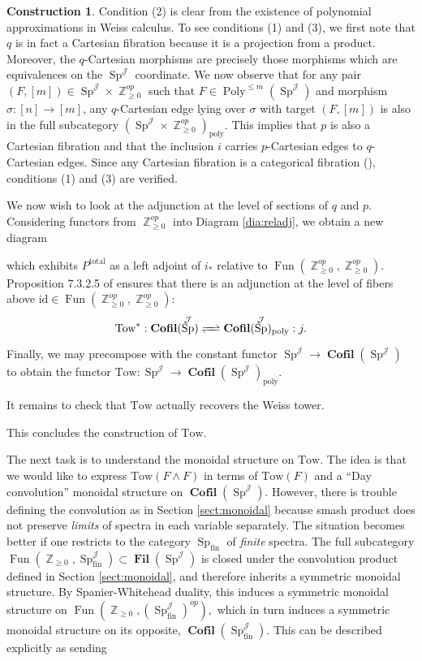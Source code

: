 \documentclass[reqno, oneside]{amsart}
\theoremstyle{definition}
\newtheorem{cnstr}[nul]{Construction}
\theoremstyle{plain}
\DeclareMathOperator{\Z}{\mathbb{Z}}
\DeclareMathOperator{\Poly}{\text{Poly}}
\DeclareMathOperator{\fin}{\text{fin}}
\DeclareMathOperator{\Fil}{\textbf{Fil}}
\DeclareMathOperator{\Fun}{\text{Fun}}
\DeclareMathOperator{\Sp}{\text{Sp}}
\DeclareMathOperator{\J}{\mathcal{J}}
\DeclareMathOperator{\Cofil}{\textbf{Cofil}}
\begin{document}
\begin{cnstr}
Condition (2) is clear from the existence of polynomial approximations in Weiss calculus.  To see conditions (1) and (3), we first note that $q$ is in fact a Cartesian fibration because it is a projection from a product.  Moreover, the $q$-Cartesian morphisms are precisely those morphisms which are equivalences on the $\Sp^{\J}$ coordinate.  We now observe that for any pair $(F, [m]) \in \Sp^{\J}\times \Z^{op}_{\geq 0}$ such that $F\in \Poly^{\leq m}(\Sp^{\J})$ and morphism $\sigma :[n]\to [m]$, any $q$-Cartesian edge lying over $\sigma$ with target $(F, [m])$ is also in the full subcategory $(\Sp^{\J}\times \Z^{op}_{\geq 0})_{\text{poly}}.$  This implies that $p$ is also a Cartesian fibration and that the inclusion $i$ carries $p$-Cartesian edges to $q$-Cartesian edges.  Since any Cartesian fibration is a categorical fibration (\cite[Proposition 3.3.1.7]{HTT}), conditions (1) and (3) are verified.  

We now wish to look at the adjunction at the level of sections of $q$ and $p$.  Considering functors from $\Z_{\geq 0}^{op}$ into Diagram \ref{dia:reladj}, we obtain a new diagram %

which exhibits $P^{\text{total}}$ as a left adjoint of $i_*$ relative to $\Fun(\Z_{\geq 0}^{op},\Z_{\geq 0}^{op}).$  Proposition 7.3.2.5 of \cite{HA} ensures that there is an adjunction at the level of fibers above $\text{id}\in \Fun(\Z_{\geq 0}^{op},\Z_{\geq 0}^{op})$: $$\text{Tow}^*: \Cofil(\Sp^{\J}) \xrightleftharpoons{\quad} \Cofil(\Sp^{\J})_{\text{poly}}:j .$$  Finally, we may precompose with the constant functor $\Sp^{\J}\to \Cofil(\Sp^{\J})$ to obtain the functor $\text{Tow}:\Sp^{\J} \to \Cofil(\Sp^{\J})_{\text{poly}}.$  

It remains to check that $\text{Tow}$ actually recovers the Weiss tower.  %


This concludes the construction of $\text{Tow}.$ 
\end{cnstr}


The next task is to understand the monoidal structure on $\text{Tow}$.  The idea is that we would like to express $\text{Tow}(F\wedge F)$ in terms of $\text{Tow}(F)$ and a ``Day convolution'' monoidal structure on $\Cofil(\Sp^{\J}).$  However, there is trouble defining the convolution as in Section \ref{sect:monoidal} because smash product does not preserve \emph{limits} of spectra in each variable separately.  The situation becomes better if one restricts to the category $\Sp_{\fin}$ of \emph{finite} spectra.  The full subcategory $\Fun(\Z_{\geq 0}, \Sp_{\fin}^{\J})\subset \Fil(\Sp^{\J})$ is closed under the convolution product defined in Section \ref{sect:monoidal}, and therefore inherits a symmetric monoidal structure.  By Spanier-Whitehead duality, this induces a symmetric monoidal structure on $\Fun(\Z_{\geq 0},(\Sp_{\fin}^{\J})^{op}),$ which in turn induces a symmetric monoidal structure on its opposite, $\Cofil(\Sp^{\J}_{\fin}).$  This can be described explicitly as sending %
\end{document}
